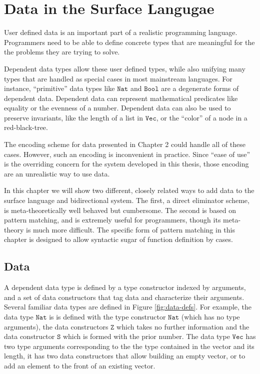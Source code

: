 \chapter{Data in the Surface Langugae}
\label{chapter:SurfaceData}
\thispagestyle{myheadings}


User defined data is an important part of a realistic programming
language. Programmers need to be able to define concrete types that
are meaningful for the the problems they are trying to solve.

Dependent data types allow these user defined types, while also unifying
many types that are handled as special cases in most mainstream languages.
For instance, ``primitive'' data types like $\mathtt{Nat}$ and
$\mathtt{Bool}$ are a degenerate forms of dependent data. Dependent
data can represent mathematical predicates like equality or the evenness
of a number. Dependent data can also be used to preserve invariants,
like the length of a list in $\mathtt{Vec}$, or the ``color'' of
a node in a red-black-tree.

The encoding scheme for data presented in Chapter 2 could handle all
of these cases. However, such an encoding is inconvenient in practice.
Since ``ease of use'' is the overriding concern for the system developed
in this thesis, those encoding are an unrealistic way to use data.

In this chapter we will show two different, closely related ways to
add data to the surface language and bidirectional system. The first,
a direct eliminator scheme, is meta-theoretically well behaved but
cumbersome. The second is based on pattern matching, and is extremely
useful for programmers, though its meta-theory is much more difficult.
The specific form of pattern matching in this chapter is designed
to allow syntactic sugar of function definition by cases. 

\section{Data}


A dependent data type is defined by a type constructor indexed by
arguments, and a set of data constructors that tag data and characterize
their arguments. Several familiar data types are defined in Figure
\ref{fig:data-defs}. For example, the data type $\mathtt{Nat}$ is
is defined with the type constructor $\mathtt{Nat}$ (which has no
type arguments), the data constructors $\mathtt{Z}$ which takes no
further information and the data constructor $\mathtt{S}$ which is
formed with the prior number. The data type $\mathtt{Vec}$ has two
type arguments corresponding to the the type contained in the vector
and its length, it has two data constructors that allow building an
empty vector, or to add an element to the front of an existing vector.

